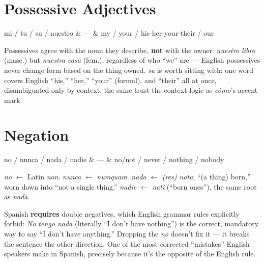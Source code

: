 \section{Possessive Adjectives}

\begin{vocabtable}
mi / tu / su / nuestro & --- & my / your / his-her-your-their / our \\
\end{vocabtable}

\begin{grammarlens}
Possessives agree with the noun they describe, \textbf{not} with the
owner: \emph{nuestro libro} (masc.) but \emph{nuestra casa} (fem.),
regardless of who ``we'' are --- English possessives never change form
based on the thing owned. \emph{su} is worth sitting with: one word covers
English ``his,'' ``her,'' ``your'' (formal), and ``their'' all at once,
disambiguated only by context, the same trust-the-context logic as
\emph{c\'{o}mo}'s accent mark.
\end{grammarlens}

\section{Negation}

\begin{vocabtable}
no / nunca / nada / nadie & --- & no/not / never / nothing / nobody \\
\end{vocabtable}

\begin{etymology}
\emph{no} $\leftarrow$ Latin \emph{non}. \emph{nunca} $\leftarrow$
\emph{numquam}. \emph{nada} $\leftarrow$ \emph{(res) nata}, ``(a thing)
born,'' worn down into ``not a single thing.'' \emph{nadie} $\leftarrow$
\emph{nati} (``born ones''), the same root as \emph{nada}.
\end{etymology}

\begin{grammarlens}
Spanish \textbf{requires} double negatives, which English grammar rules
explicitly forbid: \emph{No tengo nada} (literally ``I don't have
nothing'') is the correct, mandatory way to say ``I don't have anything.''
Dropping the \emph{no} doesn't fix it --- it breaks the sentence the other
direction. One of the most-corrected ``mistakes'' English speakers make in
Spanish, precisely because it's the opposite of the English rule.
\end{grammarlens}

